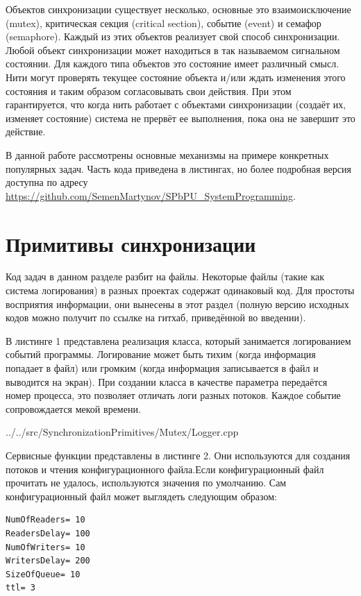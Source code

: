 \documentclass[a4paper, 12pt]{article}		%
\begin{document}
Объектов синхронизации существует несколько, основные это взаимоисключение (mutex), критическая секция (critical section), событие (event) и семафор (semaphore). Каждый из этих объектов реализует свой способ синхронизации. Любой объект синхронизации может находиться в так называемом сигнальном состоянии. Для каждого типа объектов это состояние имеет различный смысл. Нити могут проверять текущее состояние объекта и/или ждать изменения этого состояния и таким образом согласовывать свои действия. При этом гарантируется, что когда нить работает с объектами синхронизации (создаёт их, изменяет состояние) система не прервёт ее выполнения, пока она не завершит это действие. 

В данной работе рассмотрены основные механизмы на примере конкретных популярных задач. Часть кода приведена в листингах, но более подробная версия доступна по адресу \\ \url{https://github.com/SemenMartynov/SPbPU_SystemProgramming}.

\newpage
\section{Примитивы синхронизации}

Код задач в данном разделе разбит на файлы. Некоторые файлы (такие как система логирования) в разных проектах содержат одинаковый код. Для простоты восприятия информации, они вынесены в этот раздел (полную версию исходных кодов можно получит по ссылке на гитхаб, приведённой во введении).

В листинге 1 представлена реализация класса, который занимается логированием событий программы. Логирование может быть тихим (когда информация попадает в файл) или громким (когда информация записывается в файл и выводится на экран). При создании класса в качестве параметра передаётся номер процесса, это позволяет отличать логи разных потоков. Каждое событие сопровождается мекой времени.


{../../src/SynchronizationPrimitives/Mutex/Logger.cpp}

Сервисные функции представлены в листинге 2. Они используются для создания потоков и чтения конфигурационного файла.Если конфигурационный файл прочитать не удалось, используются значения по умолчанию. Сам конфигурационный файл может выглядеть следующим образом:
\begin{verbatim}
NumOfReaders= 10
ReadersDelay= 100
NumOfWriters= 10
WritersDelay= 200
SizeOfQueue= 10
ttl= 3
\end{verbatim}
\end{document}
